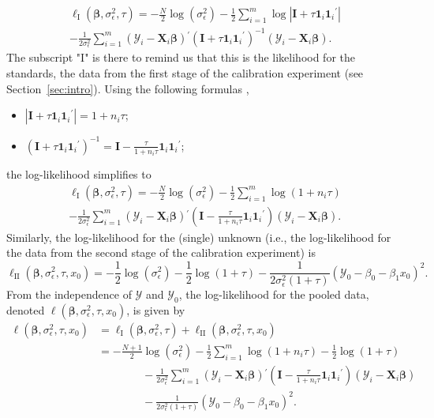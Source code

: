 \documentclass[cmfont,usenames,dvipsnames,leqno]{afit-etd}\usepackage[]{graphicx}\usepackage[]{color}
\newcommand{\newln}{\\&\quad\quad\quad\quad{}}
\newcommand{\trans}{\ensuremath{^\prime}}
\newcommand{\bc}[1]{\ensuremath{\bm{\mathcal{#1}}}}
\newcommand{\mc}[1]{\ensuremath{\mathcal{#1}}}
\newcommand{\X}{\ensuremath{\bm{X}}}
\begin{document}
\begin{multline*}
  \ell_{\mathrm{I}}\left(\bm{\beta}, \sigma_\epsilon^2, \tau\right) = -\frac{N}{2}\log\left(\sigma_\epsilon^2\right) - \frac{1}{2}\sum_{i = 1}^m \log\left|\bm{I} + \tau\bm{1}_i\bm{1}_i\trans\right| \\ - \frac{1}{2\sigma_\epsilon^2}\sum_{i = 1}^m \left(\bc{Y}_i - \X_i\bm{\beta}\right)\trans\left(\bm{I} + \tau\bm{1}_i\bm{1}_i\trans\right)^{-1}\left(\bc{Y}_i - \X_i\bm{\beta}\right).
\end{multline*}
The subscript "$\mathrm{I}$" is there to remind us that this is the likelihood for the standards, the data from the first stage of the calibration experiment (see Section~\ref{sec:intro}). Using the following formulas \citep[pg. 49]{demidenko_mixed_2013},
\begin{itemize}
  \item $\left|\bm{I} + \tau\bm{1}_i\bm{1}_i\trans\right| = 1 + n_i\tau$;
  \item $\left(\bm{I} + \tau\bm{1}_i\bm{1}_i\trans\right)^{-1} = \bm{I} - \frac{\tau}{1 + n_i\tau}\bm{1}_i\bm{1}_i\trans$;
\end{itemize}
the log-likelihood simplifies to
\begin{multline*}
  \ell_{\mathrm{I}}\left(\bm{\beta}, \sigma_\epsilon^2, \tau\right) = -\frac{N}{2}\log\left(\sigma_\epsilon^2\right) - \frac{1}{2}\sum_{i = 1}^m \log\left(1 + n_i\tau\right) \\ - \frac{1}{2\sigma_\epsilon^2}\sum_{i = 1}^m \left(\bc{Y}_i - \X_i\bm{\beta}\right)\trans\left(\bm{I} - \frac{\tau}{1 + n_i\tau}\bm{1}_i\bm{1}_i\trans\right)\left(\bc{Y}_i - \X_i\bm{\beta}\right).
\end{multline*}
Similarly, the log-likelihood for the (single) unknown (i.e., the log-likelihood for the data from the second stage of the calibration experiment) is 
\begin{equation*}
  \mc{\ell}_{\mathrm{II}}\left(\bm{\beta}, \sigma_\epsilon^2, \tau, x_0\right) = -\frac{1}{2}\log\left(\sigma_\epsilon^2\right) - \frac{1}{2}\log\left(1 + \tau\right) - \frac{1}{2\sigma_\epsilon^2\left(1 + \tau\right)}\left(\mc{Y}_0 - \beta_0 - \beta_1 x_0\right)^2.
\end{equation*}
From the independence of $\bc{Y}$ and $\mc{Y}_0$, the log-likelihood for the pooled data, denoted $\mc{\ell}\left(\bm{\beta}, \sigma_\epsilon^2, \tau, x_0\right)$, is given by
\begin{align*}
  \ell\left(\bm{\beta}, \sigma_\epsilon^2, \tau, x_0\right) &= \mc{\ell}_{\mathrm{I}}\left(\bm{\beta}, \sigma_\epsilon^2, \tau\right) + \mc{\ell}_{\mathrm{II}}\left(\bm{\beta}, \sigma_\epsilon^2, \tau, x_0\right) \\
  &= -\frac{N+1}{2}\log\left(\sigma_\epsilon^2\right) - \frac{1}{2}\sum_{i = 1}^m \log\left(1 + n_i\tau\right) - \frac{1}{2}\log\left(1 + \tau\right) \newln - \frac{1}{2\sigma_\epsilon^2}\sum_{i = 1}^m \left(\bc{Y}_i - \X_i\bm{\beta}\right)\trans\left(\bm{I} - \frac{\tau}{1 + n_i\tau}\bm{1}_i\bm{1}_i\trans\right)\left(\bc{Y}_i - \X_i\bm{\beta}\right) \newln - \frac{1}{2\sigma_\epsilon^2\left(1 + \tau\right)}\left(\mc{Y}_0 - \beta_0 - \beta_1 x_0\right)^2.
\end{align*}
\end{document}
